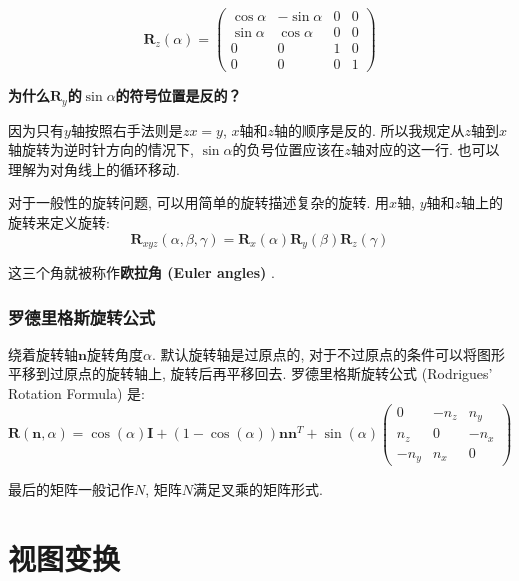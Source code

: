 \begin{equation}
	\textbf{R}_z(\alpha)=\begin{pmatrix}\cos\alpha&-\sin\alpha&0&0\\\sin\alpha&\cos\alpha&0&0\\0&0&1&0\\0&0&0&1\end{pmatrix}
\end{equation}

\begin{question}
	\textbf{为什么$\textbf{R}_y$的$\sin\alpha$的符号位置是反的？}
	
	因为只有$y$轴按照右手法则是$zx=y$, $x$轴和$z$轴的顺序是反的. 所以我规定从$z$轴到$x$轴旋转为逆时针方向的情况下, $\sin\alpha$的负号位置应该在$z$轴对应的这一行. 也可以理解为对角线上的循环移动. 
\end{question}

对于一般性的旋转问题, 可以用简单的旋转描述复杂的旋转. 用$x$轴, $y$轴和$z$轴上的旋转来定义旋转: 
\begin{equation}
	\textbf{R}_{xyz}(\alpha,\beta,\gamma)=\textbf{R}_x(\alpha)\textbf{R}_y(\beta)\textbf{R}_z(\gamma)
\end{equation}

这三个角就被称作\textbf{欧拉角 (Euler angles) }. 

\subsubsection{罗德里格斯旋转公式}

绕着旋转轴$\textbf{n}$旋转角度$\alpha$. 默认旋转轴是过原点的, 对于不过原点的条件可以将图形平移到过原点的旋转轴上, 旋转后再平移回去. 罗德里格斯旋转公式 (Rodrigues' Rotation Formula) 是: 
\begin{equation}
	\textbf{R}(\textbf{n},\alpha)=\cos(\alpha)\textbf{I}+(1-\cos(\alpha))\textbf{n}\textbf{n}^T+\sin(\alpha)\begin{pmatrix}0&-n_z&n_y\\n_z&0&-n_x\\-n_y&n_x&0\end{pmatrix}
\end{equation}

最后的矩阵一般记作$N$, 矩阵$N$满足叉乘的矩阵形式. 

%	
%	

\section{视图变换}

